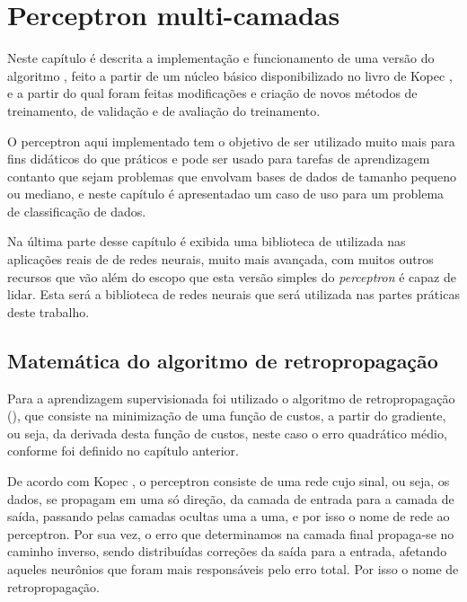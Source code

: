 
\chapter{Perceptron multi-camadas}
\label{cap:perceptron}

Neste capítulo é descrita a implementação e funcionamento de uma versão do algoritmo , feito a partir de um núcleo básico disponibilizado no livro de Kopec \citep{classic}, e a partir do qual foram feitas modificações e criação de novos métodos de treinamento, de validação e de avaliação do treinamento.

O perceptron aqui implementado tem o objetivo de ser utilizado muito mais para fins didáticos do que práticos e pode ser usado para tarefas de aprendizagem contanto que sejam problemas que envolvam bases de dados de tamanho pequeno ou mediano, e neste capítulo é apresentadao um caso de uso para um problema de classificação de dados.

Na última parte desse capítulo é exibida uma biblioteca de  utilizada nas aplicações reais de  de redes neurais, muito mais avançada, com muitos outros recursos que vão além do escopo que esta versão simples do \emph{perceptron} é capaz de lidar. Esta será a biblioteca de redes neurais que será utilizada nas partes práticas deste trabalho.

\section{Matemática do algoritmo de retropropagação}

Para a aprendizagem supervisionada foi utilizado o algoritmo de retropropagação (), que consiste na minimização de uma função de custos, a partir do gradiente, ou seja, da derivada desta função de custos, neste caso o erro quadrático médio, conforme foi definido no capítulo anterior.

De acordo com Kopec \citep{classic}, o perceptron consiste de uma rede cujo sinal, ou seja, os dados, se propagam em uma só direção, da camada de entrada para a camada de saída, passando pelas camadas ocultas uma a uma, e por isso o nome de rede  ao perceptron. Por sua vez, o erro que determinamos na camada final propaga-se no caminho inverso, sendo distribuídas correções da saída para a entrada, afetando aqueles neurônios que foram mais responsáveis pelo erro total. Por isso o nome de retropropagação.


